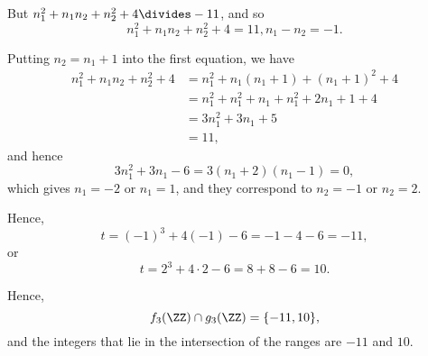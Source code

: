 \begin{enumerate}
          But \(n_1^2 + n_1 n_2 + n_2^2 + 4 \divides -11\), and so
          \[
              n_1^2 + n_1 n_2 + n_2^2 + 4 = 11, n_1 - n_2 = -1.
          \]

          Putting \(n_2 = n_1 + 1\) into the first equation, we have
          \begin{align*}
              n_1^2 + n_1 n_2 + n_2^2 + 4 & = n_1^2 + n_1 (n_1 + 1) + (n_1 + 1)^2 + 4     \\
                                          & = n_1^2 + n_1^2 + n_1 + n_1^2 + 2 n_1 + 1 + 4 \\
                                          & = 3 n_1^2 + 3 n_1 + 5                         \\
                                          & = 11,
          \end{align*}
          and hence
          \[
              3n_1^2 + 3n_1 - 6 = 3 (n_1 + 2) (n_1 - 1) = 0,
          \]
          which gives \(n_1 = -2\) or \(n_1 = 1\), and they correspond to \(n_2 = -1\) or \(n_2 = 2\).

          Hence,
          \[
              t = (-1)^3 + 4 (-1) - 6 = -1 - 4 - 6 = -11,
          \]
          or
          \[
              t = 2^3 + 4 \cdot 2 - 6 = 8 + 8 - 6 = 10.
          \]

          Hence,
          \[
              f_3(\ZZ) \cap g_3(\ZZ) = \{-11, 10\},
          \]
          and the integers that lie in the intersection of the ranges are \(-11\) and \(10\).
\end{enumerate}
